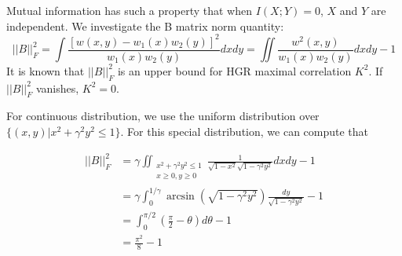 \documentclass{article}
\begin{document}
	Mutual information has such a property that when $I(X;Y)=0$, $X$
	and $Y$ are independent. We investigate
	the B matrix norm quantity:
	\begin{equation}
	||B||^2_F = \int \frac{[w(x,y)-w_1(x)w_2(y)]^2}{w_1(x)w_2(y)} dxdy= \iint  \frac{w^2(x,y)}{w_1(x)w_2(y)} dxdy-1
	\end{equation}
	It is known that $||B||^2_F$ is an upper bound for HGR maximal correlation $K^2$.
	If $||B||^2_F$ vanishes, $K^2=0$.
	
	For continuous distribution, we use the uniform distribution over
	$\{(x,y) | x^2 + \gamma^2 y^2 \leq 1 \}$.
	For this special distribution, we can compute that
	
	\begin{align*}
	||B||^2_F & = \gamma \iint_{\substack{x^2+\gamma^2 y^2\leq 1\\x\geq 0, y \geq 0}} \frac{1}{\sqrt{1-x^2}\sqrt{1-\gamma^2 y^2}}
	dxdy -1\\
	& = \gamma \int_{0}^{1/\gamma} \arcsin(\sqrt{1-\gamma^2 y^2}) \frac{dy}{\sqrt{1-\gamma^2y^2}} -1\\
	& = \int_0^{\pi/2}(\frac{\pi}{2} - \theta) d\theta -1 \\
	& = \frac{\pi^2}{8} - 1
	\end{align*}
	
\end{document}

